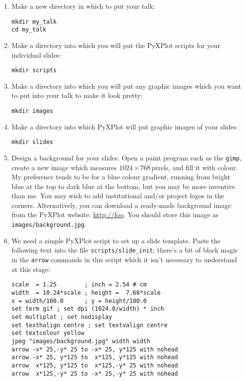 \begin{enumerate}
\item Make a new directory in which to put your talk:
\begin{verbatim}
mkdir my_talk
cd my_talk
\end{verbatim}
\item Make a directory into which you will put the PyXPlot scripts for your
individual slides:
\begin{verbatim}
mkdir scripts
\end{verbatim}
\item Make a directory into which you will put any graphic images which you
want to put into your talk to make it look pretty:
\begin{verbatim}
mkdir images
\end{verbatim}
\item Make a directory into which PyXPlot will put graphic images of your
slides:
\begin{verbatim}
mkdir slides
\end{verbatim}
\item Design a background for your slides. Open a paint program such as the
{\tt gimp}, create a new image which measures $1024\times768$\,pixels, and fill
it with colour. My preference tends to be for a blue colour gradient, running
from bright blue at the top to dark blue at the bottom, but you may be more
inventive than me. You may wish to add institutional and/or project logos in
the corners. Alternatively, you can download a ready-made background image from
the PyXPlot website: \url{http://foo}. You should store this image as {\tt
images/background.jpg}.
\item We need a simple PyXPlot script to set up a slide template. Paste the
following text into the file {\tt scripts/slide\_init}; there's a bit of black
magic in the {\tt arrow} commands in this script which it isn't necessary to
understand at this stage:\label{presentation_magic}
\begin{verbatim}
scale  = 1.25        ; inch = 2.54 # cm
width  = 10.24*scale ; height =  7.68*scale
x = width/100.0      ; y = height/100.0
set term gif ; set dpi (1024.0/width) * inch
set multiplot ; set nodisplay
set texthalign centre ; set textvalign centre
set textcolour yellow
jpeg "images/background.jpg" width width
arrow -x* 25,-y* 25 to -x* 25, y*125 with nohead
arrow -x* 25, y*125 to  x*125, y*125 with nohead
arrow  x*125, y*125 to  x*125,-y* 25 with nohead
arrow  x*125,-y* 25 to -x* 25,-y* 25 with nohead
\end{verbatim}

\end{enumerate}
